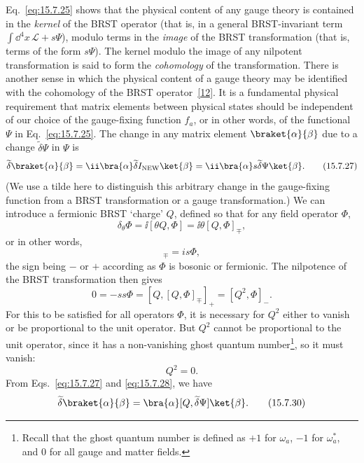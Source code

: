 Eq.~\eqref{eq:15.7.25} shows that the physical content of any gauge theory is contained in the \emph{kernel} of the BRST operator (that is, in a general BRST-invariant term $\int \dd^4x\,\mathcal L+s\Psi$), modulo terms in the \emph{image} of the BRST transformation (that is, terms of the form $s\Psi$). The kernel modulo the image of any nilpotent transformation is said to form the \emph{cohomology} of the transformation. There is another sense in which the physical content of a gauge theory may be identified with the cohomology of the BRST operator~\hyperref[ch15-ref-12]{[12]}. It is a fundamental physical requirement that matrix elements between physical states should be independent of our choice of the gauge-fixing function $f_a$, or in other words, of the functional $\Psi$ in Eq.~\eqref{eq:15.7.25}. The change in any matrix element $\braket{\alpha}{\beta}$ due to a change $\widetilde\delta\Psi$ in $\Psi$ is
\begin{equation}
 \widetilde\delta\braket{\alpha}{\beta}
 =\ii\bra{\alpha}\widetilde\delta I_{\mathrm{NEW}}\ket{\beta}
 =\ii\bra{\alpha}s\widetilde\delta\Psi\ket{\beta}.
 \tag{15.7.27}\label{eq:15.7.27}
\end{equation}
(We use a tilde here to distinguish this arbitrary change in the gauge-fixing function from a BRST transformation or a gauge transformation.) We can introduce a fermionic BRST `charge' $Q$, defined so that for any field operator $\Phi$,
\[
 \delta_\theta\Phi=\ii[\theta Q,\Phi]=\ii\theta[Q,\Phi]_{\mp},
\]
or in other words,
\begin{equation}
 [Q,\Phi]_{\mp}=is\Phi,
 \tag{15.7.28}\label{eq:15.7.28}
\end{equation}
the sign being $-$ or $+$ according as $\Phi$ is bosonic or fermionic. The nilpotence of the BRST transformation then gives
\[
 0=-ss\Phi=[Q,[Q,\Phi]_{\mp}]_+=[Q^2,\Phi]_-.
\]
For this to be satisfied for all operators $\Phi$, it is necessary for $Q^2$ either to vanish or be proportional to the unit operator. But $Q^2$ cannot be proportional to the unit operator, since it has a non-vanishing ghost quantum number\footnote{Recall that the ghost quantum number is defined as $+1$ for $\omega_a$, $-1$ for $\omega_a^*$, and 0 for all gauge and matter fields.}, so it must vanish:
\begin{equation}
 Q^2=0.
 \tag{15.7.29}\label{eq:15.7.29}
\end{equation}
From Eqs.~\eqref{eq:15.7.27} and \eqref{eq:15.7.28}, we have
\begin{equation}
 \widetilde\delta\braket{\alpha}{\beta}
 =\bra{\alpha}[Q,\widetilde\delta\Psi]\ket{\beta}.
 \tag{15.7.30}\label{eq:15.7.30}
\end{equation}
